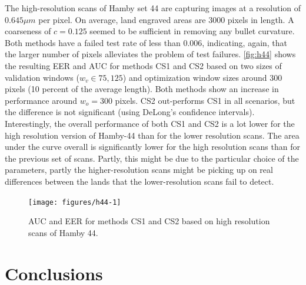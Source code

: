 \documentclass[12pt]{article}
\begin{document}
The high-resolution scans of Hamby set 44 are capturing images at a
resolution of \(0.645 \mu m\) per pixel. On average, land engraved areas
are 3000 pixels in length. A coarseness of \(c = 0.125\) seemed to be
sufficient in removing any bullet curvature. Both methods have a failed
test rate of less than 0.006, indicating, again, that the larger number
of pixels alleviates the problem of test failures. \autoref{fig:h44}
shows the resulting EER and AUC for methods CS1 and CS2 based on two
sizes of validation windows (\(w_v \in 75, 125\)) and optimization
window sizes around 300 pixels (10 percent of the average length). Both
methods show an increase in performance around \(w_o = 300\) pixels. CS2
out-performs CS1 in all scenarios, but the difference is not significant
(using DeLong's confidence intervals). Interestingly, the overall
performance of both CS1 and CS2 is a lot lower for the high resolution
version of Hamby-44 than for the lower resolution scans. The area under
the curve overall is significantly lower for the high resolution scans
than for the previous set of scans. Partly, this might be due to the
particular choice of the parameters, partly the higher-resolution scans
might be picking up on real differences between the lands that the
lower-resolution scans fail to detect.

\begin{figure}

{\centering \texttt{[image: figures/h44-1]} 

}

\caption{AUC and EER for methods CS1 and CS2 based on high resolution scans of Hamby 44. }\label{fig:h44}
\end{figure}

\hypertarget{conclusions}{%
\section*{Conclusions}\label{conclusions}}
\end{document}
